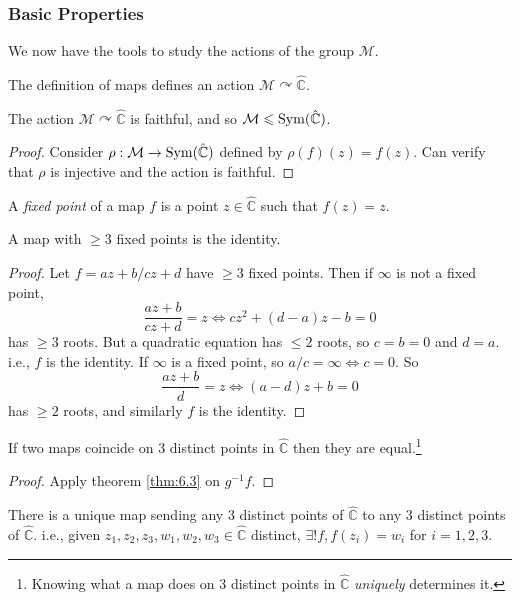 \documentclass[a4paper]{article}
\begin{document}
\subsubsection{Basic Properties}
We now have the tools to study the actions of the \mobius group $ \mathcal{M} $.
\begin{remark}
  The definition of \mobius maps defines an action $ \mathcal{M}
  \curvearrowright \hat{\mathbb{C}} $.
\end{remark}
\begin{proposition}\label{prop:6.1}
  The action $ \mathcal{M} \curvearrowright \hat{\mathbb{C}} $ is
  faithful, and so $ \mathcal{M}\leqslant \operatorname{Sym}(\hat{\mathbb{C}}) $.
\end{proposition}
\begin{proof}
  Consider $ \rho: \mathcal{M} \to \operatorname{Sym}(\hat{\mathbb{C}}) $ defined
  by $ \rho(f)(z)=f(z) $. Can verify that $ \rho $ is injective and
  the action is faithful.
\end{proof}
\begin{definition}
  A \textit{fixed point} of a \mobius map $f$ is a point $z\in
  \hat{\mathbb{C}}$ such that $ f(z)=z $.
\end{definition}
\begin{theorem}\label{thm:6.3}
  A \mobius map with $\ge 3$ fixed points is the identity.
\end{theorem}
\begin{proof}
  Let $ f=az+b/cz+d $ have $\ge 3$ fixed points. Then if $\infty$ is
  not a fixed point,
  \[
    \frac{az+b}{cz+d}=z \Longleftrightarrow cz^2+(d-a)z-b=0
  \]
  has $\ge 3$ roots. But a quadratic equation has $\le 2$ roots, so
  $c=b=0$ and $d=a$. i.e., $f$ is the identity.
  If $\infty$ is a fixed point, so $ a/c=\infty \Leftrightarrow c=0 $. So
  \[
    \frac{az+b}{d}=z \Longleftrightarrow (a-d)z+b=0
  \]
  has $\ge 2$ roots, and similarly $f$ is the identity.
\end{proof}
\begin{corollary}\label{col:6.4}
  If two \mobius maps coincide on 3 distinct points in $
  \hat{\mathbb{C}} $ then they are equal.\footnote{Knowing what a
    \mobius map does on 3 distinct points in $ \hat{\mathbb{C}} $
  \textit{uniquely} determines it.}
\end{corollary}
\begin{proof}
  Apply theorem \ref{thm:6.3} on $g^{-1}f$.
\end{proof}
\begin{theorem}\label{thm:6.5}
  There is a unique \mobius map sending any 3 distinct points of $
  \hat{\mathbb{C}} $ to any 3 distinct points of $ \hat{\mathbb{C}}
  $. i.e., given $ z_1,z_2,z_3, w_1,w_2,w_3\in \hat{\mathbb{C}} $
  distinct, $ \exists ! f, f(z_i)=w_i $ for $i=1,2,3$.
\end{theorem}
\end{document}
